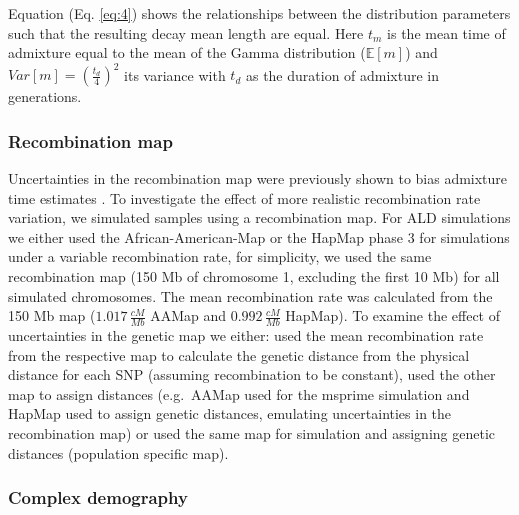 \documentclass[]{article}
\begin{document}
Equation (Eq. \ref{eq:4}) shows the relationships between the
distribution parameters such that the resulting decay mean length are
equal. Here  $t_{m}$ is the mean time of admixture equal to the mean of the Gamma distribution ($\mathbb{E}[m]$) and $Var[m]=(\frac{t_d}{4})^2$ its variance with $t_d$ as the duration of admixture in generations.

\subsubsection{Recombination map}\label{recombination map}

Uncertainties in the recombination map were previously shown to bias
admixture time estimates \citep{sankararaman_date_2012,sankararaman_combined_2016,fu_genome_2014}. To investigate the effect of more realistic
recombination rate variation, we simulated samples using a recombination map. For ALD simulations we
either used the African-American-Map \citep{hinch_landscape_2011} or
the HapMap phase 3 \citep{HapMapConsortium_second_2007} for simulations
under a variable recombination rate, for simplicity, we used the same
recombination map (150 Mb of chromosome 1, excluding the first 10 Mb)
for all simulated chromosomes. The mean recombination rate was
calculated from the 150 Mb map (\(1.017 \, \frac{cM}{Mb}\) AAMap and
\(0.992 \, \frac{cM}{Mb}\) HapMap). To examine the effect of uncertainties in the
genetic map we either: used the mean recombination rate from the
respective map to calculate the genetic distance from the physical
distance for each SNP (assuming recombination to be constant), used the other map to assign distances
(e.g.~AAMap used for the msprime simulation and HapMap used to assign
genetic distances, emulating uncertainties in the recombination map) or used the same map for simulation and assigning
genetic distances (population specific map). 

\subsubsection{Complex demography}\label{inferred demography}
\end{document}
